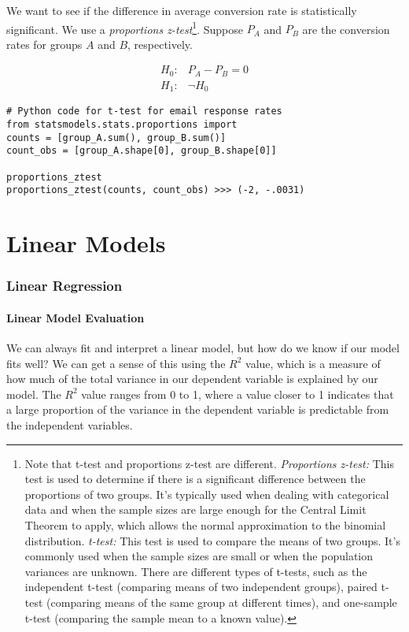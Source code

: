 \documentclass{article}
\theoremstyle{definition}
\theoremstyle{theorem}
\theoremstyle{theorem}
\theoremstyle{theorem}
\theoremstyle{theorem}
\theoremstyle{definition}
\theoremstyle{definition}
\theoremstyle{definition}
\theoremstyle{definition}
\theoremstyle{definition}
\begin{document}
We want to see if the difference in average conversion rate is statistically significant. We use a \textit{proportions z-test}\footnote{Note that t-test and proportions z-test are different. \textit{Proportions z-test:} This test is used to determine if there is a significant difference between the proportions of two groups. It's typically used when dealing with categorical data and when the sample sizes are large enough for the Central Limit Theorem to apply, which allows the normal approximation to the binomial distribution. \textit{t-test:} This test is used to compare the means of two groups. It's commonly used when the sample sizes are small or when the population variances are unknown. There are different types of t-tests, such as the independent t-test (comparing means of two independent groups), paired t-test (comparing means of the same group at different times), and one-sample t-test (comparing the sample mean to a known value).}. Suppose $P_A$ and $P_B$ are the conversion rates for groups $A$ and $B$, respectively.

\begin{align*}
    H_0: & P_A - P_B = 0 \\
    H_1: & \neg H_0
\end{align*}

\lstset{language=Python}
\begin{lstlisting}
# Python code for t-test for email response rates
from statsmodels.stats.proportions import 
counts = [group_A.sum(), group_B.sum()]
count_obs = [group_A.shape[0], group_B.shape[0]]

proportions_ztest
proportions_ztest(counts, count_obs) >>> (-2, -.0031)
\end{lstlisting}


\part{Linear Models}
\section{Linear Regression}
\subsection{Linear Model Evaluation}

We can always fit and interpret a linear model, but how do we know if our model fits well? We can get a sense of this using the \( R^2 \) value, which is a measure of how much of the total variance in our dependent variable is explained by our model. The \( R^2 \) value ranges from 0 to 1, where a value closer to 1 indicates that a large proportion of the variance in the dependent variable is predictable from the independent variables. 
\end{document}
